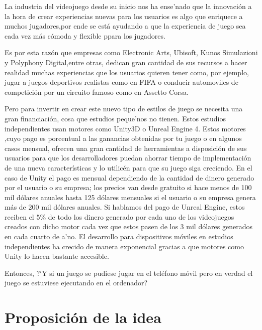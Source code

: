 La industria del videojuego desde su inicio nos ha ense'nado que la innovaci\'on
 a la hora de crear experiencias nuevas para los usuarios es algo que enriquece a muchos jugadores,por ende se est\'a ayudando a que
la experiencia de juego sea cada vez m\'as c\'omoda y flexible ppara los jugadores.

Es por esta raz\'on que empresas como Electronic Arts, Ubisoft, Kunos Simulazioni y Polyphony Digital,entre otras, dedican gran cantidad de sus recursos
a hacer realidad muchas experiencias que los usuarios quieren tener como, por ejemplo,
 jugar a juegos deportivos realistas como en FIFA o conducir automoviles de competici\'on por un circuito famoso como en Assetto Corsa.

Pero para invertir en crear este nuevo tipo de estilos de juego se necesita una gran financiaci\'on,
 cosa que estudios peque'nos no tienen.  Estos estudios independientes usan motores como Unity3D o Unreal Engine 4.
 Estos motores ,cuyo pago es porcentual a las ganancias obtenidas por tu juego o en algunos casos mensual, ofrecen una gran cantidad de herramientas a disposici\'on 
de sus usuarios para que los desarrolladores puedan ahorrar tiempo de implementaci\'on de una nueva caracter\'isticas y lo utilic\'en para que su juego siga creciendo.
En el caso de Unity el pago es mensual dependiendo de la cantidad de dinero generado por el usuario o su empresa;
 los precios van desde gratuito si hace menos de 100 mil d\'olares anuales hasta 125 d\'olares mensuales si el usuario o su empresa genera m\'as de 200 mil d\'olares
  anuales. 
  Si hablamos del pago de Unreal Engine, estos reciben el 5\% de todo los dinero generado por cada uno de los videojuegos creados con dicho motor cada vez que estos pasen de los 3 mil d\'olares generados en cada cuarto de a'no.  
El desarrollo para dispositivos m\'oviles en estudios independientes ha crecido de manera exponencial gracias a que motores como Unity lo hacen bastante accesible. 


Entonces,
 ?`Y si un juego se pudiese jugar en el tel\'efono m\'ovil pero en verdad el juego se estuviese ejecutando en el ordenador?


\section{Proposici\'on de la idea}
\label{cap1:sec:porp-idea}

